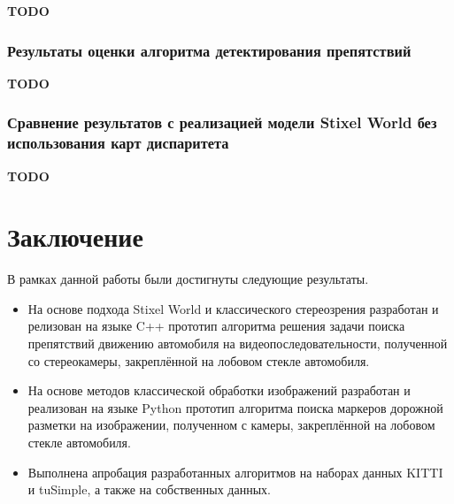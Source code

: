 \documentclass[aps,%
14pt,%
final,%
oneside,
onecolumn,%
musixtex, %
superscriptaddress,%
centertags]{extarticle} %
\begin{document}
\textbf{\Large \color{Red} TODO}

\subsubsection{Результаты оценки алгоритма детектирования препятствий}

\textbf{\Large \color{Red} TODO}

\subsubsection{Сравнение результатов с реализацией модели Stixel World без использования карт диспаритета}

\textbf{\Large \color{Red} TODO}

\section{Заключение}

В рамках данной работы были достигнуты следующие результаты.

\begin{itemize}
\item На основе подхода Stixel World и классического стереозрения разработан и релизован на языке C++ прототип алгоритма решения задачи поиска препятствий движению автомобиля на видеопоследовательности, полученной со стереокамеры, закреплённой на лобовом стекле автомобиля.

\item На основе методов классической обработки изображений разработан и реализован на языке Python прототип алгоритма поиска маркеров дорожной разметки на изображении, полученном с камеры, закреплённой на лобовом стекле автомобиля.

\item Выполнена апробация разработанных алгоритмов на наборах данных KITTI и tuSimple, а также на собственных данных.

\end{itemize}

\newpage



\end{document}
